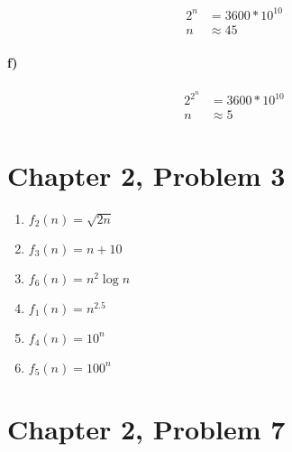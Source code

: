 \documentclass[12pt]{article}
\begin{document}
\begin{align*}
        2^n&=3600*10^{10}\\
        n&\approx 45
\end{align*}

\paragraph{f)}

\begin{align*}
        2^{2^n}&=3600*10^{10}\\
        n&\approx 5
\end{align*}

\section*{Chapter 2, Problem 3}

\begin{enumerate}
        \item \(f_2(n)=\sqrt{2n}\)
        \item \(f_3(n)=n+10\)
        \item \(f_6(n)=n^2 \log n\)
        \item \(f_1(n)=n^{2.5}\)
        \item \(f_4(n)=10^n\)
        \item \(f_5(n)=100^n\)
\end{enumerate}

\section*{Chapter 2, Problem 7}
\end{document}
